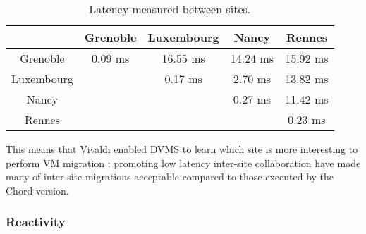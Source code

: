 \begin{table}

  \begin{center}
    \begin{tabular}{|c|c|c|c|c|}   

      \hline \multicolumn{1}{|p{2cm}|}{ } & \multicolumn{1}{|p{2cm}|}{\centering Grenoble }  & \multicolumn{1}{|p{2cm}|}{\centering Luxembourg } & \multicolumn{1}{|p{2cm}|}{\centering Nancy }& \multicolumn{1}{|p{2cm}|}{\centering Rennes } \\

      \hline
      Grenoble & 0.09 ms & 16.55 ms & 14.24 ms & 15.92 ms \\

      \hline
      Luxembourg &  & 0.17 ms & 2.70 ms & 13.82 ms \\

      \hline
      Nancy & &  & 0.27 ms & 11.42 ms \\

      \hline
      Rennes &  &  &  & 0.23 ms \\

      \hline
    \end{tabular}
  \end{center}
  \caption{\label{latency_table} Latency measured between sites.}
\end{table}

This means that Vivaldi enabled DVMS to learn which site is more interesting to
perform VM migration : promoting low latency inter-site collaboration have made 
many of inter-site migrations acceptable compared to those executed by the Chord
version.


\subsubsection{Reactivity}


